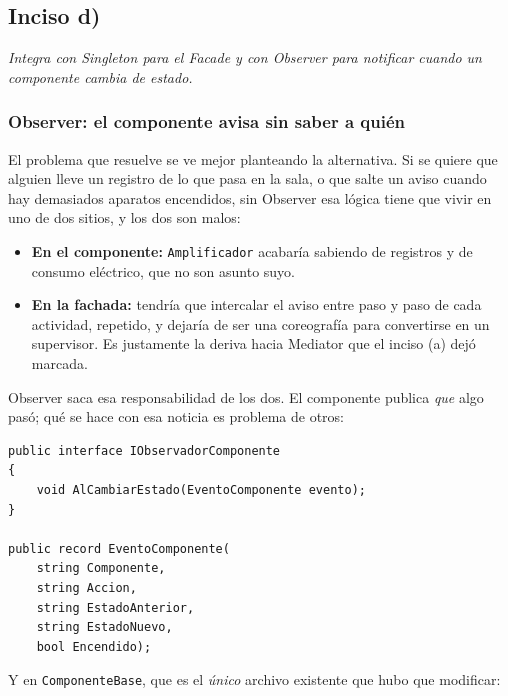 {}
\subsection*{Inciso d)}

\sloppy

\textit{Integra con Singleton para el Facade y con Observer para notificar cuando un
componente cambia de estado.}

\vspace{0.4cm}

\subsubsection*{Observer: el componente avisa sin saber a quién}

El problema que resuelve se ve mejor planteando la alternativa. Si se quiere que alguien lleve
un registro de lo que pasa en la sala, o que salte un aviso cuando hay demasiados aparatos
encendidos, sin Observer esa lógica tiene que vivir en uno de dos sitios, y los dos son malos:

\begin{itemize}[leftmargin=1.2cm]
    \item \textbf{En el componente:} \texttt{Amplificador} acabaría sabiendo de registros y
          de consumo eléctrico, que no son asunto suyo.
    \item \textbf{En la fachada:} tendría que intercalar el aviso entre paso y paso de cada
          actividad, repetido, y dejaría de ser una coreografía para convertirse en un
          supervisor. Es justamente la deriva hacia Mediator que el inciso (a) dejó marcada.
\end{itemize}

Observer saca esa responsabilidad de los dos. El componente publica \emph{que} algo pasó; qué
se hace con esa noticia es problema de otros:

{\small
\begin{verbatim}
public interface IObservadorComponente
{
    void AlCambiarEstado(EventoComponente evento);
}

public record EventoComponente(
    string Componente,
    string Accion,
    string EstadoAnterior,
    string EstadoNuevo,
    bool Encendido);
\end{verbatim}
}

Y en \texttt{ComponenteBase}, que es el \emph{único} archivo existente que hubo que modificar:

